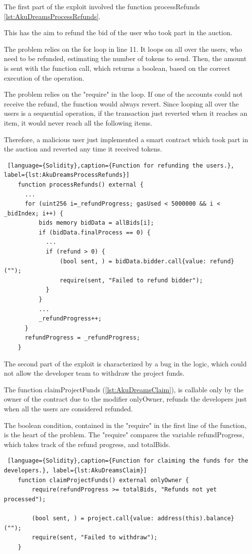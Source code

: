 The first part of the exploit involved the function processRefunds \autoref{lst:AkuDreamsProcessRefunds}.

This has the aim to refund the bid of the user who took part in the auction. 

The problem relies on the for loop in line 11. 
It loops on all over the users, who need to be refunded, estimating the number of tokens to send. 
Then, the amount is sent with the function call, which returns a boolean, based on the correct execution of the operation.

The problem relies on the "require" in the loop. If one of the accounts could not receive the refund, the function would always revert.
Since looping all over the users is a sequential operation, if the transaction just reverted when it reaches an item, it would never reach all the following items. 

Therefore, a malicious user just implemented a smart contract which took part in the auction and reverted any time it received tokens.

\begin{lstlisting} [language={Solidity},caption={Function for refunding the users.}, label={lst:AkuDreamsProcessRefunds}]
    function processRefunds() external {
      ...
      for (uint256 i=_refundProgress; gasUsed < 5000000 && i < _bidIndex; i++) {
          bids memory bidData = allBids[i];
          if (bidData.finalProcess == 0) {
            ...
            if (refund > 0) {
                (bool sent, ) = bidData.bidder.call{value: refund}("");
                require(sent, "Failed to refund bidder");
            }
          }
          ...
          _refundProgress++;
      }
      refundProgress = _refundProgress;
    }
\end{lstlisting}
The second part of the exploit is characterized by a bug in the logic, which could not allow the developer team to withdraw the project funds. 

The function claimProjectFunds (\autoref{lst:AkuDreamsClaim}), is callable only by the owner of the contract due to the modifier onlyOwner, 
refunds the developers just when all the users are considered refunded. 

The boolean condition, contained in the "require" in the first line of the function, is the heart of the problem. 
The "require" compares the variable refundProgress, which takes track of the refund progress, 
and totalBids.
\begin{lstlisting} [language={Solidity},caption={Function for claiming the funds for the developers.}, label={lst:AkuDreamsClaim}]
    function claimProjectFunds() external onlyOwner {
        require(refundProgress >= totalBids, "Refunds not yet processed");

        (bool sent, ) = project.call{value: address(this).balance}("");
        require(sent, "Failed to withdraw");        
    }
\end{lstlisting}

